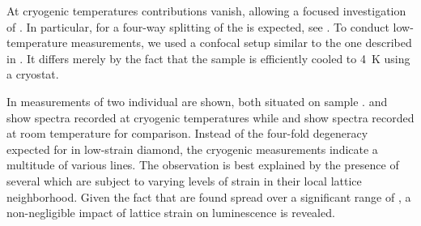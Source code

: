 			At cryogenic temperatures \psb contributions vanish, allowing a focused investigation of \zpls.
			In particular, for \sivs a four-way splitting of the \zpl is expected, see .
			To conduct low-temperature measurements, we used a confocal setup similar to the one described in .
			It differs merely by the fact that the sample is efficiently cooled to \SI{4}{\kelvin} using a cryostat.
			
			In  measurements of two individual \nds are shown, both situated on sample \insituSo.
			 and  show spectra recorded at cryogenic temperatures while  and  show spectra recorded at room temperature for comparison.
			Instead of the four-fold degeneracy expected for \sivs in low-strain diamond, the cryogenic measurements indicate a multitude of various lines.
			The observation is best explained by the presence of several \sivs which are subject to varying levels of strain in their local lattice neighborhood.
			Given the fact that \zpls are found spread over a significant range of \wls, a non-negligible impact of lattice strain on \siv luminescence is revealed.
